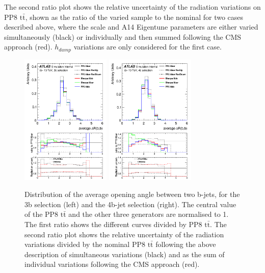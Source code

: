 The second ratio plot shows the relative uncertainty of the radiation variations on PP8 $\mathrm{t\bar{t}}$, shown as the ratio of the varied sample to the nominal for two cases described above, where the scale and A14 Eigentune parameters are either varied simultaneously (black) or individually and then summed following the CMS approach (red). $h_{damp}$ variations are only considered for the first case.



\begin{figure}[!htb]
\centering
\includegraphics[width=0.38\textwidth]{Plots/ttbb/hisgenEvt_Dr_GenBJetsAverage_4j3t__div}
\includegraphics[width=0.38\textwidth]{Plots/ttbb/hisgenEvt_Dr_GenBJetsAverage_4j4t__div}
  \caption{Distribution of the average opening angle between two b-jets, for the 3b selection (left) and the 4b-jet selection (right). The central value of the PP8 $\mathrm{t\bar{t}}$ and the other three generators are normalised to 1. The first ratio shows the different curves divided by PP8 $\mathrm{t\bar{t}}$. The second ratio plot shows the relative uncertainty of the radiation variations divided by the nominal PP8 $\mathrm{t\bar{t}}$ following the above description of simultaneous variations (black) and as the sum of individual variations following the CMS approach (red).  \label{ttbb:avedR}}
\end{figure}

